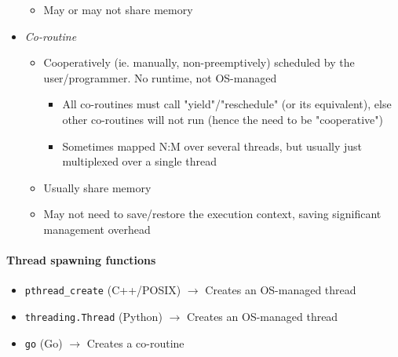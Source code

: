 \begin{itemize}
\begin{itemize}[nolistsep,noitemsep]
\begin{itemize}
				\end{itemize}
			\item May or may not share memory
		\end{itemize}
	\item \textit{Co-routine}
		\begin{itemize}[nolistsep,noitemsep]
			\item Cooperatively (ie. manually, non-preemptively) scheduled by the user/programmer. No runtime, not OS-managed
			\begin{itemize}[nolistsep,noitemsep]
				\item All co-routines must call "yield"/"reschedule" (or its equivalent), else other co-routines will not run (hence the need to be "cooperative")
				\item Sometimes mapped N:M over several threads, but usually just multiplexed over a single thread
			\end{itemize}
			\item Usually share memory
			\item May not need to save/restore the execution context, saving significant management overhead
		\end{itemize}
\end{itemize}

\paragraph{Thread spawning functions}
\begin{itemize}[nolistsep,noitemsep]
	\item \verb|pthread_create| (C++/POSIX) $\rightarrow$ Creates an OS-managed thread
	\item \verb|threading.Thread| (Python) $\rightarrow$ Creates an OS-managed thread
	\item \verb|go| (Go) $\rightarrow$ Creates a co-routine
\end{itemize}


